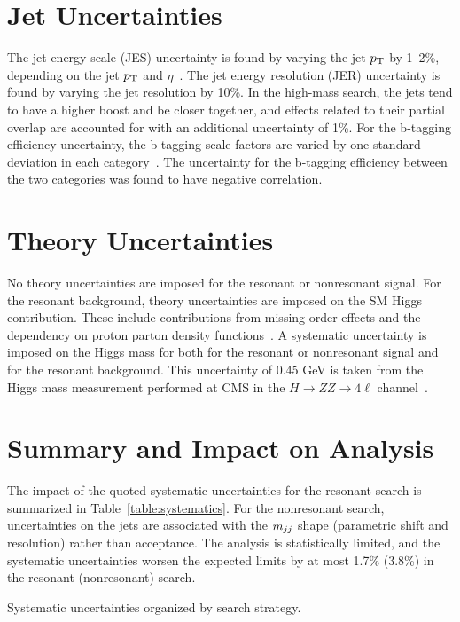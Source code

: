 \section{Jet Uncertainties\label{sec:jetunc}}

The jet energy scale (JES) uncertainty is found by varying the jet $p_{\rm T}$ by 1--2\%,
depending on the jet $p_{\rm T}$ and $\eta$~\cite{JINST6}.
The jet energy resolution (JER) uncertainty is found by varying the jet resolution by 10\%.
In the high-mass search, the jets tend to have a higher boost and be closer together,
and effects related to their partial overlap are accounted for with an additional uncertainty of 1\%.
For the b-tagging efficiency uncertainty, the b-tagging scale factors are varied by one standard
deviation in each category~\cite{BTV}. 
The uncertainty for the b-tagging efficiency between the two categories
was found to have negative correlation.

\section{Theory Uncertainties\label{sec:theoryunc}}

No theory uncertainties are imposed for the resonant or nonresonant signal.
For the resonant background, theory uncertainties are imposed on the SM Higgs contribution. These
include contributions from missing order effects and the dependency on proton parton density
functions~\cite{Dittmaier:2011ti,LHC:SMHiggsBR}.
A systematic uncertainty is imposed on the Higgs mass for both for the resonant or nonresonant signal
and for the resonant background.
This uncertainty of 0.45 GeV is taken from the Higgs mass measurement performed at CMS in the
$H\rightarrow ZZ \rightarrow 4\ell$ channel~\cite{Chatrchyan:2013mxa}.

\section{Summary and Impact on Analysis\label{sec:uncimpact}}

The impact of the quoted systematic uncertainties for the resonant search is summarized in
Table~\ref{table:systematics}. For the nonresonant search, uncertainties on the jets are
associated with the $m_{jj}$ shape (parametric shift and resolution) rather than acceptance.
The analysis is statistically limited, and the systematic uncertainties worsen the expected limits
by at most 1.7\% (3.8\%) in the resonant (nonresonant) search.

\begin{table}[htbp!]
  \centering
  \renewcommand{\arraystretch}{1.4}
  \caption{Systematic uncertainties organized by search strategy.}
  
  \label{table:systematics}
\end{table}
